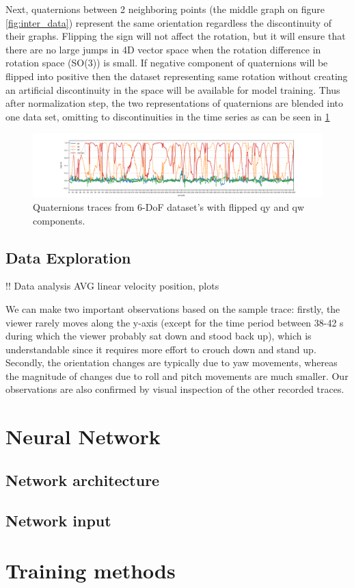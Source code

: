 Next, quaternions between 2 neighboring points (the middle graph on figure \ref{fig:inter_data}) represent the same orientation regardless the discontinuity of their graphs. Flipping the sign will not affect the rotation, but it will ensure that there are no large jumps in 4D vector space when the rotation difference in rotation space (SO(3)) is small. If negative component of quaternions will be flipped into positive then the dataset representing same rotation without creating an artificial discontinuity in the space will be available for model training. Thus after normalization step, the two representations of quaternions are blended into one data set, omitting to discontinuities in the time series as can be seen in \ref{fig:norm_data} 

\begin{figure}[htb]
	\begin{center}
		\includegraphics[width=1\textwidth, keepaspectratio]{gfx/Fig-1556-quaternions_flipped.pdf}
		\caption{\label{fig:norm_data}Quaternions traces from 6-DoF dataset's with flipped qy and qw components.}
	\end{center}
\end{figure}



\subsection{Data Exploration}
\label{sec:design:dataset:explor}
!! Data analysis AVG linear velocity position, plots 

We can make two important observations based on the sample trace: firstly, the viewer rarely moves along the y-axis (except for the time period between 38-42 s during which the viewer probably sat down and stood back up), which is understandable since it requires more effort to crouch down and stand up. Secondly, the orientation changes are typically due to yaw movements, whereas the magnitude of changes due to roll and pitch movements are much smaller. Our observations are also confirmed by visual inspection of the other recorded traces.


\section{Neural Network}
\label{sec:design:nn}

\subsection{Network architecture}
\label{sec:design:nn:architecture}

\subsection{Network input}
\label{sec:design:nn:input}


\section{Training methods}
\label{sec:design:train}
